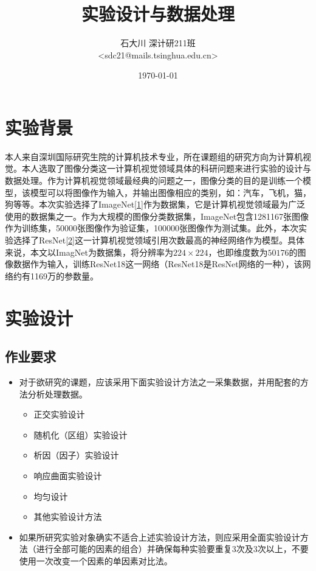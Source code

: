 \documentclass[UTF8]{ctexart}
\title{实验设计与数据处理}
\author{石大川 \quad 深计研211班\\ <sdc21@mails.tsinghua.edu.cn>}
\date{\today}
\begin{document}
	\maketitle
	\tableofcontents \newpage
	
	\section{实验背景}
	本人来自深圳国际研究生院的计算机技术专业，所在课题组的研究方向为计算机视觉。本人选取了图像分类这一计算机视觉领域具体的科研问题来进行实验的设计与数据处理。作为计算机视觉领域最经典的问题之一，图像分类的目的是训练一个模型，该模型可以将图像作为输入，并输出图像相应的类别，如：汽车，飞机，猫，狗等等。本次实验选择了ImageNet\hyperref[ref1]{[1]}作为数据集，它是计算机视觉领域最为广泛使用的数据集之一。作为大规模的图像分类数据集，ImageNet包含1281167张图像作为训练集，50000张图像作为验证集，100000张图像作为测试集。此外，本次实验选择了ResNet\hyperref[ref2]{[2]}这一计算机视觉领域引用次数最高的神经网络作为模型。具体来说，本文以ImagNet为数据集，将分辨率为$224\times 224$，也即维度数为$50176$的图像数据作为输入，训练ResNet18这一网络（ResNet18是ResNet网络的一种），该网络约有1169万的参数量。
	
	\section{实验设计}
	
	\subsection{作业要求}
	
	\begin{itemize}
		\item 对于欲研究的课题，应该采用下面实验设计方法之一采集数据，并用配套的方法分析处理数据。
		\begin{itemize}
			\item 正交实验设计
			\item 随机化（区组）实验设计
			\item 析因（因子）实验设计
			\item 响应曲面实验设计
			\item 均匀设计
			\item 其他实验设计方法
		\end{itemize} 
		\item 如果所研究实验对象确实不适合上述实验设计方法，则应采用全面实验设计方法（进行全部可能的因素的组合）并确保每种实验要重复3次及3次以上，不要使用一次改变一个因素的单因素对比法。

	\end{itemize} 
	
\end{document}
